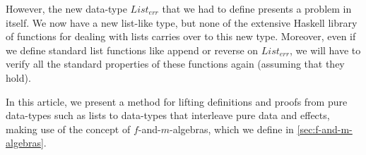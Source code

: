\documentclass{jfp1}
\newcommand{\kw}[1]{\textbf{#1}}
\begin{document}
However, the new data-type $\mathit{List_{err}}$ that we had to define
presents a problem in itself. We now have a new list-like type, but
none of the extensive Haskell library of functions for dealing with
lists carries over to this new type. Moreover, even if we define
standard list functions like append or reverse on
$\mathit{List_{err}}$, we will have to verify all the standard
properties of these functions again (assuming that they hold).

In this article, we present a method for lifting definitions and
proofs from pure data-types such as lists to data-types that interleave
pure data and effects, making use of the concept of
$f$-and-$m$-algebras, which we define in
\autoref{sec:f-and-m-algebras}.



\end{document}
